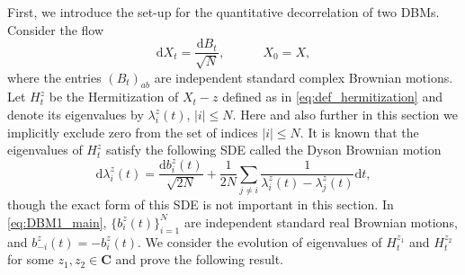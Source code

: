 \documentclass[10pt]{amsart}
\numberwithin{equation}{section}
\newcommand{\dif}{\mathrm{d}}
\newcommand{\C}{\mathbf{C}}
\begin{document}
First, we introduce the set-up for the quantitative decorrelation of two DBMs. Consider the flow 
\begin{equation}
\label{eq:matDBM1_main}
\dif X_t=\frac{\dif B_t}{\sqrt{N}}, \qquad\quad X_0=X,
\end{equation}
where the entries $(B_t)_{ab}$ are independent standard complex Brownian motions. Let $H_t^z$ be the Hermitization of $X_t-z$ defined as in \eqref{eq:def_hermitization} and denote its eigenvalues by $\lambda_i^z(t)$, $|i|\le N$.  Here and also further in this section we implicitly exclude zero from the set of indices $|i|\le N$. It is known that the eigenvalues of $H_t^z$ satisfy the following SDE called the Dyson Brownian motion
\begin{equation}
\label{eq:DBM1_main}
\dif \lambda_i^z(t)=\frac{\dif b_i^z(t)}{\sqrt{2N}}+\frac{1}{2N}\sum_{j\ne i}\frac{1}{\lambda_i^z(t)-\lambda_j^z(t)}\dif t,
\end{equation}
though the exact form of this SDE is not important in this section. In \eqref{eq:DBM1_main}, $\{b_i^z(t)\}_{i=1}^N$ are independent standard real Brownian motions, and $b_{-i}^z(t)=-b_i^z(t)$. We consider the evolution of eigenvalues of $H_t^{z_1}$ and $H_t^{z_2}$ for some $z_1,z_2\in\C$ and prove the following result. 
\end{document}
